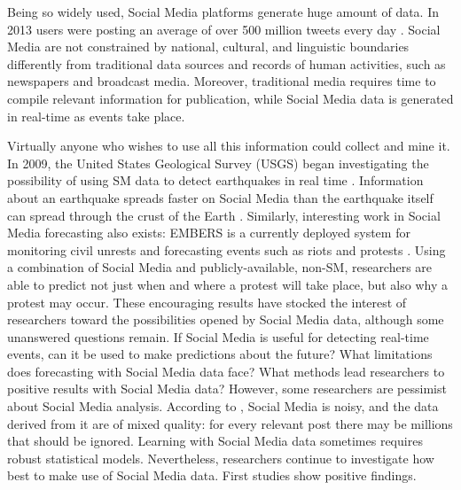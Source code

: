 \documentclass[]{book}
\begin{document}
Being so widely used, Social Media platforms generate huge amount of
data. In 2013 users were posting an average of over 500 million tweets
every day \citep{krikorian2013new}. Social Media are not constrained by
national, cultural, and linguistic boundaries differently from
traditional data sources and records of human activities, such as
newspapers and broadcast media. Moreover, traditional media requires
time to compile relevant information for publication, while Social Media
data is generated in real-time as events take place.

Virtually anyone who wishes to use all this information could collect
and mine it. In 2009, the United States Geological Survey (USGS) began
investigating the possibility of using SM data to detect earthquakes in
real time \citep{ellis2015usgs}. Information about an earthquake spreads
faster on Social Media than the earthquake itself can spread through the
crust of the Earth \citep{konkel2013tweets}. Similarly, interesting work
in Social Media forecasting also exists: EMBERS is a currently deployed
system for monitoring civil unrests and forecasting events such as riots
and protests \citep{ramakrishnan2014beating}. Using a combination of
Social Media and publicly-available, non-SM, researchers are able to
predict not just when and where a protest will take place, but also why
a protest may occur. These encouraging results have stocked the interest
of researchers toward the possibilities opened by Social Media data,
although some unanswered questions remain. If Social Media is useful for
detecting real-time events, can it be used to make predictions about the
future? What limitations does forecasting with Social Media data face?
What methods lead researchers to positive results with Social Media
data? However, some researchers are pessimist about Social Media
analysis. According to
\citep[\citet{weller2015accepting}]{ruths2014social}, Social Media is
noisy, and the data derived from it are of mixed quality: for every
relevant post there may be millions that should be ignored. Learning
with Social Media data sometimes requires robust statistical models.
Nevertheless, researchers continue to investigate how best to make use
of Social Media data. First studies show positive findings.
\end{document}
